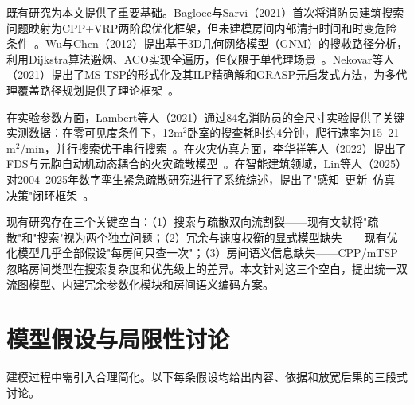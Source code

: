\documentclass[12pt,a4paper]{ctexart}
\begin{document}
既有研究为本文提供了重要基础。Bagloee与Sarvi（2021）首次将消防员建筑搜索问题映射为CPP+VRP两阶段优化框架，但未建模房间内部清扫时间和时变危险条件~\cite{bagloee2021emergency}。Wu与Chen（2012）提出基于3D几何网络模型（GNM）的搜救路径分析，利用Dijkstra算法避烟、ACO实现全遍历，但仅限于单代理场景~\cite{wu2012threedimensional}。Nekovar等人（2021）提出了MS-TSP的形式化及其ILP精确解和GRASP元启发式方法，为多代理覆盖路径规划提供了理论框架~\cite{nekovar2021multitour}。

在实验参数方面，Lambert等人（2021）通过84名消防员的全尺寸实验提供了关键实测数据：在零可见度条件下，12$\text{m}^2$卧室的搜查耗时约4分钟，爬行速率为15--21 $\text{m}^2$/min，并行搜索优于串行搜索~\cite{lambert2021searchrescue}。在火灾仿真方面，李华祥等人（2022）提出了FDS与元胞自动机动态耦合的火灾疏散模型~\cite{li2022fdsca}。在智能建筑领域，Lin等人（2025）对2004--2025年数字孪生紧急疏散研究进行了系统综述，提出了"感知--更新--仿真--决策"闭环框架~\cite{lin2025digitaltwin}。

现有研究存在三个关键空白：（1）搜索与疏散双向流割裂——现有文献将"疏散"和"搜索"视为两个独立问题；（2）冗余与速度权衡的显式模型缺失——现有优化模型几乎全部假设"每房间只查一次"；（3）房间语义信息缺失——CPP/mTSP忽略房间类型在搜索复杂度和优先级上的差异。本文针对这三个空白，提出统一双流图模型、内建冗余参数化模块和房间语义编码方案。

\section{模型假设与局限性讨论}

建模过程中需引入合理简化。以下每条假设均给出内容、依据和放宽后果的三段式讨论。
\end{document}
